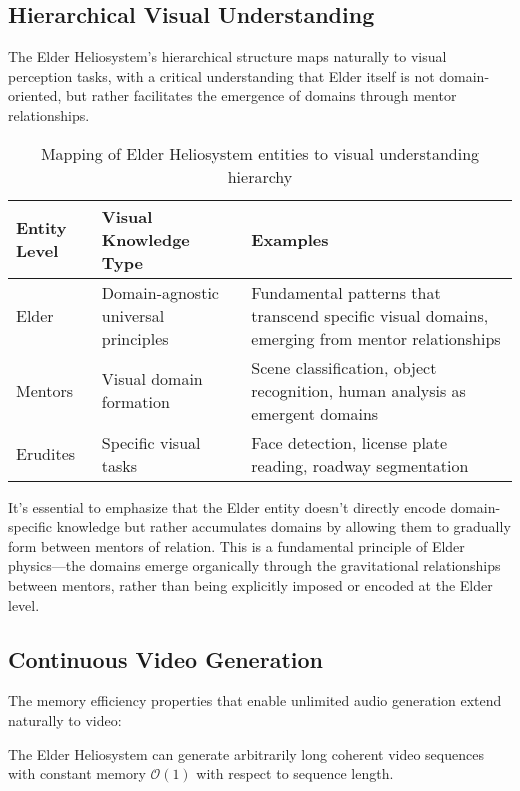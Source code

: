 \subsection{Hierarchical Visual Understanding}

The Elder Heliosystem's hierarchical structure maps naturally to visual perception tasks, with a critical understanding that Elder itself is not domain-oriented, but rather facilitates the emergence of domains through mentor relationships.

\begin{table}[h]
\centering
\begin{tabular}{p{3cm} | p{5cm} | p{6cm}}
\textbf{Entity Level} & \textbf{Visual Knowledge Type} & \textbf{Examples} \\
\hline
Elder & Domain-agnostic universal principles & Fundamental patterns that transcend specific visual domains, emerging from mentor relationships \\
\hline
Mentors & Visual domain formation & Scene classification, object recognition, human analysis as emergent domains \\
\hline
Erudites & Specific visual tasks & Face detection, license plate reading, roadway segmentation \\
\end{tabular}
\caption{Mapping of Elder Heliosystem entities to visual understanding hierarchy}
\end{table}

It's essential to emphasize that the Elder entity doesn't directly encode domain-specific knowledge but rather accumulates domains by allowing them to gradually form between mentors of relation. This is a fundamental principle of Elder physics—the domains emerge organically through the gravitational relationships between mentors, rather than being explicitly imposed or encoded at the Elder level.

\subsection{Continuous Video Generation}

The memory efficiency properties that enable unlimited audio generation extend naturally to video:

\begin{proposition}
The Elder Heliosystem can generate arbitrarily long coherent video sequences with constant memory $\mathcal{O}(1)$ with respect to sequence length.
\end{proposition}

